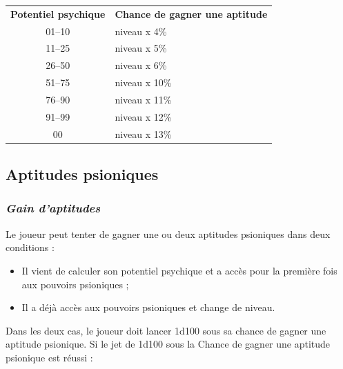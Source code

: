 \documentclass[11pt]{article}
\begin{document}
{{\parindent3cm\begin{tabular}{cl}
\textbf{Potentiel psychique} & \textbf{Chance de gagner une aptitude} \\
01--10 & niveau x 4\% \\
11--25 & niveau x 5\% \\
26--50 & niveau x 6\% \\
51--75 & niveau x 10\% \\
76--90 & niveau x 11\% \\
91--99 & niveau x 12\% \\
\hspace{0.4cm}00 & niveau x 13\% \\
\end{tabular}}

\subsection*{Aptitudes psioniques}

\subsubsection*{\textit{Gain d'aptitudes}}

Le joueur peut tenter de gagner une ou deux aptitudes psioniques dans deux conditions :

\bigskip

\begin{itemize}
\item Il vient de calculer son potentiel psychique et a accès pour la première fois aux pouvoirs psioniques ;
\item Il a déjà accès aux pouvoirs psioniques et change de niveau.
\end{itemize}

\bigskip

Dans les deux cas, le joueur doit lancer 1d100 sous sa chance de gagner une aptitude psionique. Si le jet de 1d100 sous la Chance de gagner une aptitude psionique est réussi :

\bigskip

}
\end{document}
